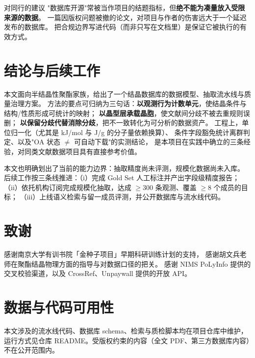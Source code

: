 \documentclass[11pt,a4paper]{ctexart}
\begin{document}
\begin{tipbox}{对同行的建议}
"数据库开源"常被当作项目的结题指标，但\textbf{绝不能为凑量放入受限来源的数据}。
一篇因版权问题被撤的论文，对项目与作者的伤害远大于一个延迟发布的数据库。
把合规边界写进代码（而非只写在文档里）是保证它被执行的有效方式。
\end{tipbox}

\section{结论与后续工作}

本文面向半结晶性聚酯家族，给出了一个结晶数据库的数据模型、抽取流水线与质量治理方案。
方法的要点可归纳为三句话：\textbf{以观测行为计数单元}，使结晶条件与结构/性质形成可统计的映射；
\textbf{以晶型层承载晶胞}，使文献间分歧不被去重规则误删；
\textbf{以保留分歧代替消除分歧}，把不一致转化为可分析的数据资产。
工程上，单位归一化（尤其是 kJ/mol 与 J/g 的分子量依赖换算）、
条件字段豁免统计离群判定、以及"OA 状态 $\neq$ 可自动下载"的实测结论，
是本项目在实践中确立的三条经验，对同类文献数据项目具有直接参考价值。

本文也明确划出了当前的能力边界：抽取精度尚未评测，规模化数据尚未入库。
后续工作按三条线推进：（i）完成 Gold Set 人工标注并产出字段级精度报告；
（ii）依托机构订阅完成规模化抽取，达成 $\geq 300$ 条观测、覆盖 $\geq 8$ 个成员的目标；
（iii）上线语义检索与留一成员评测，并公开数据库与流水线代码。

\section*{致谢}
感谢南京大学有训书院「金种子项目」早期科研训练计划的支持，
感谢胡文兵老师在聚酯结晶物理方面的指导与对数据口径的把关。
感谢 NIMS PoLyInfo 提供的交叉校验渠道，以及 CrossRef、Unpaywall 提供的开放 API。

\section*{数据与代码可用性}
本文涉及的流水线代码、数据库 schema、检索与质检脚本均在项目仓库中维护，
运行方式见仓库 README。受版权约束的内容（全文 PDF、第三方数据库内容）不在公开范围内。
\end{document}
